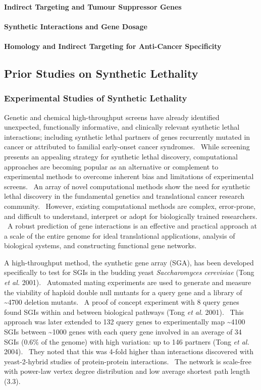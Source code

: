 \paragraph{Indirect Targeting and Tumour Suppressor Genes}
\paragraph{Synthetic Interactions and Gene Dosage}
\paragraph{Homology and Indirect Targeting for Anti-Cancer Specificity}

\subsection{Prior Studies on Synthetic Lethality}
\subsubsection[Experimental Studies of Synthetic Lethality]{Experimental Studies of Synthetic Lethality}
Genetic and chemical high-throughput screens have already identified unexpected, functionally informative, and clinically relevant synthetic lethal interactions; including synthetic lethal partners of genes recurrently mutated in cancer or attributed to familial early-onset cancer syndromes. \ While screening presents an appealing strategy for synthetic lethal discovery, computational approaches are becoming popular as an alternative or complement to experimental methods to overcome inherent bias and limitations of experimental screens. \ An array of novel computational methods show the need for synthetic lethal discovery in the fundamental genetics and translational cancer research community. \ However, existing computational methods are complex, error-prone, and difficult to understand, interpret or adopt for biologically trained researchers. \ A robust prediction of gene interactions is an effective and practical approach at a scale of the entire genome for ideal translational applications, analysis of biological systems, and constructing functional gene networks.

A high-throughput method, the synthetic gene array (SGA), has been developed specifically to test for SGIs in the budding yeast \textit{Saccharomyces cerevisiae} (Tong\textit{ et al.} 2001). \ Automated mating experiments are used to generate and measure the viability of haploid double null mutants for a query gene and a library of \~{}4700 deletion mutants. \ A proof of concept experiment with 8 query genes found SGIs within and between biological pathways (Tong\textit{ et al.} 2001). \ This approach was later extended to 132 query genes to experimentally map \~{}4100 SGIs between \~{}1000 genes with each query gene involved in an average of 34 SGIs (0.6\% of the genome) with high variation: up to 146 partners (Tong\textit{ et al.} 2004). \ They noted that this was 4-fold higher than interactions discovered with yeast-2-hybrid studies of protein-protein interactions. \ The network is scale-free with power-law vertex degree distribution and low average shortest path length (3.3). \  

